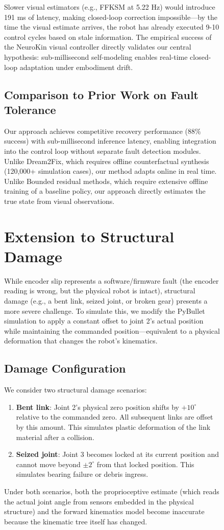 \documentclass[12pt,a4paper,oneside]{report}
\begin{document}
\begin{figure}[H]
Slower visual estimators (e.g., FFKSM at 5.22 Hz) would introduce 191 ms of latency, making closed-loop correction impossible---by the time the visual estimate arrives, the robot has already executed 9-10 control cycles based on stale information. The empirical success of the NeuroKin visual controller directly validates our central hypothesis: sub-millisecond self-modeling enables real-time closed-loop adaptation under embodiment drift.

\subsection{Comparison to Prior Work on Fault Tolerance}

Our approach achieves competitive recovery performance (88\% success) with sub-millisecond inference latency, enabling integration into the control loop without separate fault detection modules. Unlike Dream2Fix, which requires offline counterfactual synthesis (120,000+ simulation cases), our method adapts online in real time. Unlike Bounded residual methods, which require extensive offline training of a baseline policy, our approach directly estimates the true state from visual observations.

\section{Extension to Structural Damage}

While encoder slip represents a software/firmware fault (the encoder reading is wrong, but the physical robot is intact), structural damage (e.g., a bent link, seized joint, or broken gear) presents a more severe challenge. To simulate this, we modify the PyBullet simulation to apply a constant offset to joint 2's actual position while maintaining the commanded position---equivalent to a physical deformation that changes the robot's kinematics.

\subsection{Damage Configuration}

We consider two structural damage scenarios:
\begin{enumerate}
    \item \textbf{Bent link}: Joint 2's physical zero position shifts by $+10^\circ$ relative to the commanded zero. All subsequent links are offset by this amount. This simulates plastic deformation of the link material after a collision.
    \item \textbf{Seized joint}: Joint 3 becomes locked at its current position and cannot move beyond $\pm2^\circ$ from that locked position. This simulates bearing failure or debris ingress.
\end{enumerate}
Under both scenarios, both the proprioceptive estimate (which reads the actual joint angle from sensors embedded in the physical structure) and the forward kinematics model become inaccurate because the kinematic tree itself has changed.


\end{figure}
\end{document}
